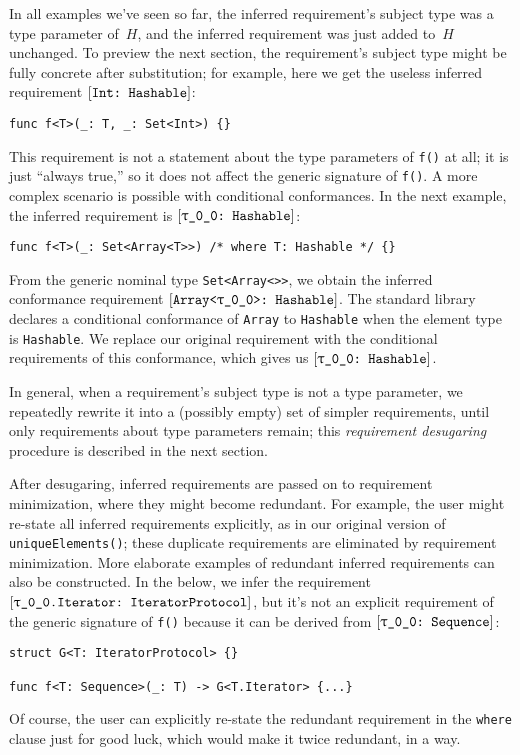 \documentclass[../generics]{subfiles}
\begin{document}
In all examples we've seen so far, the inferred requirement's subject type was a type parameter of~$H$, and the inferred requirement was just added to~$H$ unchanged. To preview the next section, the requirement's subject type might be fully concrete after substitution; for example, here we get the useless inferred requirement $[\texttt{Int:~Hashable}]$:
\begin{Verbatim}
func f<T>(_: T, _: Set<Int>) {}
\end{Verbatim}
This requirement is not a statement about the type parameters of \texttt{f()} at all; it is just ``always true,'' so it does not affect the generic signature of \texttt{f()}. A more complex scenario is possible with conditional conformances. In the next example, the inferred requirement is $\ConfReq{\rT}{Hashable}$:
\begin{Verbatim}
func f<T>(_: Set<Array<T>>) /* where T: Hashable */ {}
\end{Verbatim}
From the generic nominal type \texttt{Set<Array<\rT>>}, we obtain the inferred conformance requirement $\ConfReq{Array<\rT>}{Hashable}$. The standard library declares a conditional conformance of \texttt{Array} to \texttt{Hashable} when the element type is \texttt{Hashable}. We replace our original requirement with the conditional requirements of this conformance, which gives us $\ConfReq{\rT}{Hashable}$.

In general, when a requirement's subject type is not a type parameter, we repeatedly rewrite it into a (possibly empty) set of simpler requirements, until only requirements about type parameters remain; this \emph{requirement desugaring} procedure is described in the next section.

After desugaring, inferred requirements are passed on to requirement minimization, where they might become redundant. For example, the user might re-state all inferred requirements explicitly, as in our original version of \texttt{uniqueElements()}; these duplicate requirements are eliminated by requirement minimization. More elaborate examples of redundant inferred requirements can also be constructed. In the below, we infer the requirement $\ConfReq{\rT.Iterator}{IteratorProtocol}$, but it's not an explicit requirement of the generic signature of \texttt{f()} because it can be derived from $\ConfReq{\rT}{Sequence}$:
\begin{Verbatim}
struct G<T: IteratorProtocol> {}

func f<T: Sequence>(_: T) -> G<T.Iterator> {...}
\end{Verbatim}
Of course, the user can explicitly re-state the redundant requirement in the \texttt{where} clause just for good luck, which would make it twice redundant, in a way.
\end{document}
